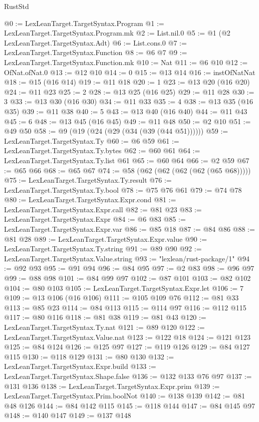 \begin{lexlean}{RustStd}
\begin{coremodule}
@0 := LexLeanTarget.TargetSyntax.Program
@1 := LexLeanTarget.TargetSyntax.Program.mk
@2 := List.nil.{0}
@5 := @1 (@2 LexLeanTarget.TargetSyntax.Adt)
@6 := List.cons.{0}
@7 := LexLeanTarget.TargetSyntax.Function
@8 := @6 @7
@9 := LexLeanTarget.TargetSyntax.Function.mk
@10 := Nat
@11 := @6 @10
@12 := OfNat.ofNat.{0}
@13 := @12 @10
@14 := 0
@15 := @13 @14
@16 := instOfNatNat
@18 := @15 (@16 @14)
@19 := @11 @18
@20 := 1
@23 := @13 @20 (@16 @20)
@24 := @11 @23
@25 := 2
@28 := @13 @25 (@16 @25)
@29 := @11 @28
@30 := 3
@33 := @13 @30 (@16 @30)
@34 := @11 @33
@35 := 4
@38 := @13 @35 (@16 @35)
@39 := @11 @38
@40 := 5
@43 := @13 @40 (@16 @40)
@44 := @11 @43
@45 := 6
@48 := @13 @45 (@16 @45)
@49 := @11 @48
@50 := @2 @10
@51 := @49 @50
@58 := @9 (@19 (@24 (@29 (@34 (@39 (@44 @51))))))
@59 := LexLeanTarget.TargetSyntax.Ty
@60 := @6 @59
@61 := LexLeanTarget.TargetSyntax.Ty.bytes
@62 := @60 @61
@64 := LexLeanTarget.TargetSyntax.Ty.list @61
@65 := @60 @64
@66 := @2 @59
@67 := @65 @66
@68 := @65 @67
@74 := @58 (@62 (@62 (@62 (@62 (@65 @68)))))
@75 := LexLeanTarget.TargetSyntax.Ty.result
@76 := LexLeanTarget.TargetSyntax.Ty.bool
@78 := @75 @76 @61
@79 := @74 @78
@80 := LexLeanTarget.TargetSyntax.Expr.cond
@81 := LexLeanTarget.TargetSyntax.Expr.call
@82 := @81 @23
@83 := LexLeanTarget.TargetSyntax.Expr
@84 := @6 @83
@85 := LexLeanTarget.TargetSyntax.Expr.var
@86 := @85 @18
@87 := @84 @86
@88 := @81 @28
@89 := LexLeanTarget.TargetSyntax.Expr.value
@90 := LexLeanTarget.TargetSyntax.Ty.string
@91 := @89 @90
@92 := LexLeanTarget.TargetSyntax.Value.string
@93 := "lexlean/rust-package/1"
@94 := @92 @93
@95 := @91 @94
@96 := @84 @95
@97 := @2 @83
@98 := @96 @97
@99 := @88 @98
@101 := @84 @99 @97
@102 := @87 @101
@103 := @82 @102
@104 := @80 @103
@105 := LexLeanTarget.TargetSyntax.Expr.let
@106 := 7
@109 := @13 @106 (@16 @106)
@111 := @105 @109 @76
@112 := @81 @33
@113 := @85 @23
@114 := @84 @113
@115 := @114 @97
@116 := @112 @115
@117 := @80 @116
@118 := @81 @38
@119 := @81 @43
@120 := LexLeanTarget.TargetSyntax.Ty.nat
@121 := @89 @120
@122 := LexLeanTarget.TargetSyntax.Value.nat
@123 := @122 @18
@124 := @121 @123
@125 := @84 @124
@126 := @125 @97
@127 := @119 @126
@129 := @84 @127 @115
@130 := @118 @129
@131 := @80 @130
@132 := LexLeanTarget.TargetSyntax.Expr.build
@133 := LexLeanTarget.TargetSyntax.Shape.false
@136 := @132 @133 @76 @97
@137 := @131 @136
@138 := LexLeanTarget.TargetSyntax.Expr.prim
@139 := LexLeanTarget.TargetSyntax.Prim.boolNot
@140 := @138 @139
@142 := @81 @48 @126
@144 := @84 @142 @115
@145 := @118 @144
@147 := @84 @145 @97
@148 := @140 @147
@149 := @137 @148

\end{coremodule}
\end{lexlean}
